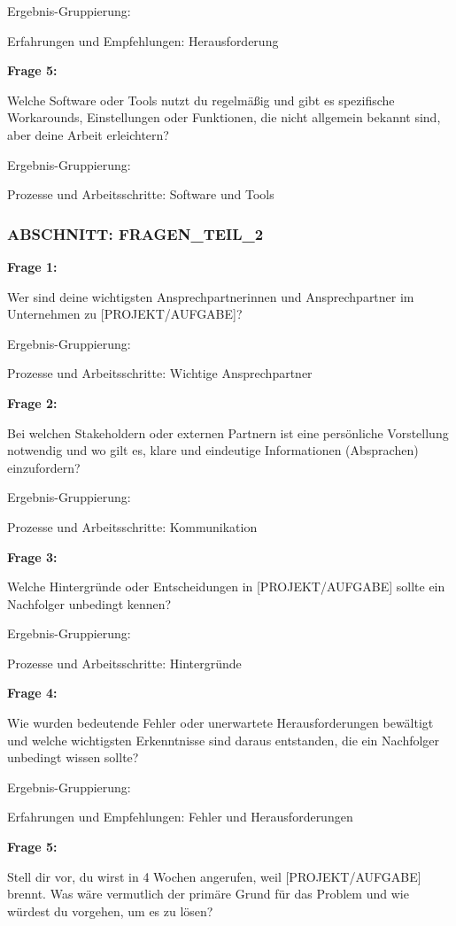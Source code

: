 \documentclass[
  10pt,
  ngerman,
  a4paper,
  toc=graduated,
  numbers=noenddot,
  headings=standardclasses,
  nonumberlist
]{scrartcl}
\begin{document}
Ergebnis-Gruppierung:

Erfahrungen und Empfehlungen: Herausforderung

\textbf{Frage 5:}

Welche Software oder Tools nutzt du regelmäßig und gibt es spezifische Workarounds, Einstellungen oder Funktionen, die nicht allgemein bekannt sind, aber deine Arbeit erleichtern?

Ergebnis-Gruppierung:

Prozesse und Arbeitsschritte: Software und Tools

\subsubsection*{ABSCHNITT: FRAGEN\_TEIL\_2}

\textbf{Frage 1:}

Wer sind deine wichtigsten Ansprechpartnerinnen und Ansprechpartner im Unternehmen zu [PROJEKT/\allowbreak AUFGABE]?

Ergebnis-Gruppierung:

Prozesse und Arbeitsschritte: Wichtige Ansprechpartner

\textbf{Frage 2:}

Bei welchen Stakeholdern oder externen Partnern ist eine persönliche Vorstellung notwendig und wo gilt es, klare und eindeutige Informationen (Absprachen) einzufordern?

Ergebnis-Gruppierung:

Prozesse und Arbeitsschritte: Kommunikation

\textbf{Frage 3:}

Welche Hintergründe oder Entscheidungen in [PROJEKT/AUFGABE] sollte ein Nachfolger unbedingt kennen?

Ergebnis-Gruppierung:

Prozesse und Arbeitsschritte: Hintergründe

\textbf{Frage 4:}

Wie wurden bedeutende Fehler oder unerwartete Herausforderungen bewältigt und welche wichtigsten Erkenntnisse sind daraus entstanden, die ein Nachfolger unbedingt wissen sollte?

Ergebnis-Gruppierung:

Erfahrungen und Empfehlungen: Fehler und Herausforderungen

\textbf{Frage 5:}

Stell dir vor, du wirst in 4 Wochen angerufen, weil [PROJEKT/AUFGABE] brennt. Was wäre vermutlich der primäre Grund für das Problem und wie würdest du vorgehen, um es zu lösen?
\end{document}
